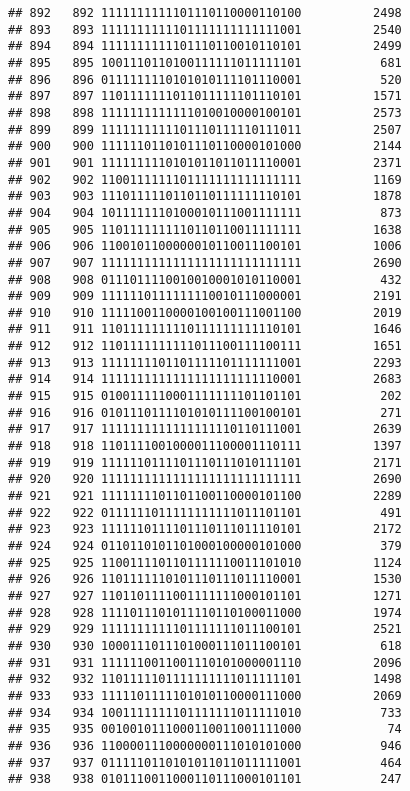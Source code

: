 \documentclass[]{article}
\begin{document}
\begin{verbatim}
## 892   892 1111111111101110110000110100          2498
## 893   893 1111111111101111111111111001          2540
## 894   894 1111111111101110110010110101          2499
## 895   895 1001110110100111111011111101           681
## 896   896 0111111110101010111101110001           520
## 897   897 1101111111011011111101110101          1571
## 898   898 1111111111111010010000100101          2573
## 899   899 1111111111101110111110111011          2507
## 900   900 1111110110101110110000101000          2144
## 901   901 1111111110101011011011110001          2371
## 902   902 1100111111101111111111111111          1169
## 903   903 1110111110110110111111110101          1878
## 904   904 1011111110100010111001111111           873
## 905   905 1101111111110110110011111111          1638
## 906   906 1100101100000010110011100101          1006
## 907   907 1111111111111111111111111111          2690
## 908   908 0111011110010010001010110001           432
## 909   909 1111110111111110010111000001          2191
## 910   910 1111100110000100100111001100          2019
## 911   911 1101111111110111111111110101          1646
## 912   912 1101111111111011100111100111          1651
## 913   913 1111111101101111101111111001          2293
## 914   914 1111111111111111111111110001          2683
## 915   915 0100111110001111111101101101           202
## 916   916 0101110111101010111100100101           271
## 917   917 1111111111111111110110111001          2639
## 918   918 1101111001000011100001110111          1397
## 919   919 1111110111101110111010111101          2171
## 920   920 1111111111111111111111111111          2690
## 921   921 1111111101101100110000101100          2289
## 922   922 0111111011111111111011101101           491
## 923   923 1111110111101110111011110101          2172
## 924   924 0110110101101000100000101000           379
## 925   925 1100111101101111110011101010          1124
## 926   926 1101111110101110111011110001          1530
## 927   927 1101101111001111111000101101          1271
## 928   928 1111011101011110110100011000          1974
## 929   929 1111111111101111111011100101          2521
## 930   930 1000111011101000111011100101           618
## 931   931 1111110011001110101000001110          2096
## 932   932 1101111101111111111011111101          1498
## 933   933 1111101111101010110000111000          2069
## 934   934 1001111111101111111011111010           733
## 935   935 0010010111000110011001111000            74
## 936   936 1100001110000000111010101000           946
## 937   937 0111110110101011011011111001           464
## 938   938 0101110011000110111000101101           247

\end{verbatim}
\end{document}
